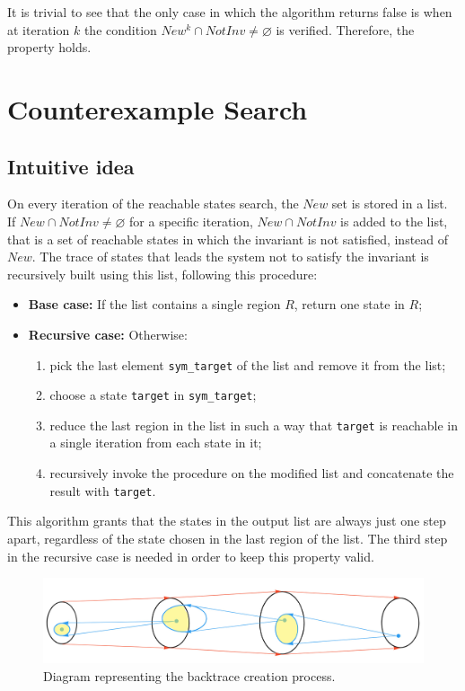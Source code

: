 \documentclass[12pt]{article}
\begin{document}
    It is trivial to see that the only case in which the algorithm returns false is when at iteration $k$ the condition $New^k \cap NotInv \neq \varnothing$ is verified.
    Therefore, the property holds.
    
    \section{Counterexample Search}
    \subsection{Intuitive idea}
    On every iteration of the reachable states search, the $New$ set is stored in a list.
    If $New \cap NotInv \neq \varnothing$ for a specific iteration, $New \cap NotInv$ is added to the list, that is a set of reachable states in which the invariant is not satisfied, instead of $New$.
    The trace of states that leads the system not to satisfy the invariant is recursively built using this list, following this procedure:
    \begin{itemize}
        \item \textbf{Base case:} If the list contains a single region $R$, return one state in $R$;
        \item \textbf{Recursive case:} Otherwise:
        \begin{enumerate}
            \item pick the last element \texttt{sym\_target} of the list and remove it from the list;
            \item choose a state \texttt{target} in \texttt{sym\_target};
            \item reduce the last region in the list in such a way that \texttt{target} is reachable in a single iteration from each state in it;
            \item recursively invoke the procedure on the modified list and concatenate the result with \texttt{target}.
        \end{enumerate}
    \end{itemize}
    This algorithm grants that the states in the output list are always just one step apart, regardless of the state chosen in the last region of the list.
    The third step in the recursive case is needed in order to keep this property valid.
    
    \begin{figure}[H] 
        \centering
        \includegraphics[width=\textwidth]{backtrace-diagram.png}
        \caption{Diagram representing the backtrace creation process.}
        \label{fig:back_trace}
    \end{figure}
\end{document}
